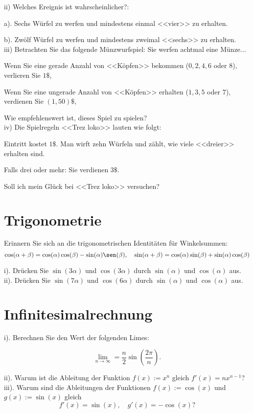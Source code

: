 
ii) Welches Ereignis ist wahrscheinlicher?:

a). Sechs Würfel zu werfen und mindestens einmal <<vier>> zu erhalten.

b). Zwölf Würfel zu werfen und mindestens zweimal <<sechs>> zu erhalten.\\

iii) Betrachten Sie das folgende Münzwurfspiel: Sie werfen achtmal eine Münze...

Wenn Sie eine gerade Anzahl von <<Köpfen>>  bekommen ($0,2,4,6$ oder $8$), verlieren Sie $1\$ $,

Wenn Sie eine ungerade Anzahl von <<Köpfen>> erhalten ($1,3,5$ oder $7$), verdienen Sie $(1,50)\$$,

Wie empfehlenswert ist, dieses Spiel zu spielen?\\

iv) Die Spielregeln <<Trez loko>> lauten wie folgt:

Eintritt kostet $1\$$. Man wirft zehn Würfeln und zählt, wie viele <<dreier>> erhalten sind.

Falls drei oder mehr: Sie verdienen $3\$$.

Soll ich mein Glück bei <<Trez loko>> versuchen? 

\section*{Trigonometrie}

Erinnern Sie sich an die trigonometrischen Identitäten für Winkelsummen:
$$\cos(\alpha+\beta)=\cos(\alpha)\cos(\beta)-\sin(\alpha)\sen(\beta), \quad \sin(\alpha+\beta)=\cos(\alpha)\sin(\beta)+\sin(\alpha)\cos(\beta)$$

i). Drücken Sie $\sin(3\alpha)$ und $\cos(3\alpha)$ durch $\sin(\alpha)$ und $\cos(\alpha)$ aus.\\

ii). Drücken Sie  $\sin(7\alpha)$ und $\cos(6\alpha)$ durch $\sin(\alpha)$ und $\cos(\alpha)$ aus.


\section*{Infinitesimalrechnung}

i). Berechnen Sie den Wert der folgenden Limes:

$$\lim_{n\to\infty}=\frac{n}{2}\sin\left(\frac{2 \pi}{n} \right).$$


ii). Warum ist die Ableitung der Funktion $f(x):=x^n$ gleich $f'(x)=nx^{n-1}$?\\


iii). Warum sind die Ableitungen der Funktionen $f(x):=\cos(x)$ und $g(x):=\sin(x)$ gleich $$f'(x)=\sin(x), \quad g'(x)=-\cos(x)?$$
